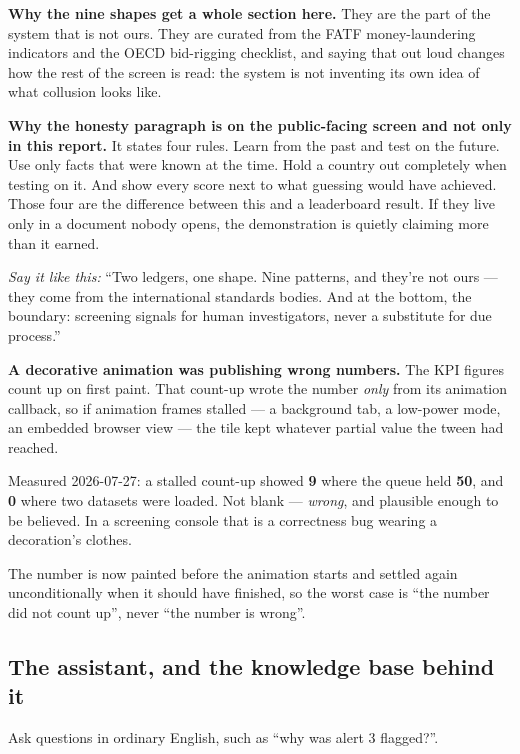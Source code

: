 \documentclass[11pt,a4paper]{article}
\newcommand{\aloud}[1]{\par\smallskip\noindent\textit{\textcolor{accent}{Say
it like this:}} ``#1''\par\smallskip}
\begin{document}
\textbf{Why the nine shapes get a whole section here.} They are the part of the
system that is not ours. They are curated from the FATF money-laundering
indicators and the OECD bid-rigging checklist, and saying that out loud changes
how the rest of the screen is read: the system is not inventing its own idea of
what collusion looks like.

\textbf{Why the honesty paragraph is on the public-facing screen and not only in
this report.} It states four rules. Learn from the past and test on the future.
Use only facts that were known at the time. Hold a country out completely when
testing on it. And show every score next to what guessing would have achieved.
Those four are the difference between this and a leaderboard result. If they
live only in a document nobody opens, the demonstration is quietly claiming
more than it earned.

\aloud{Two ledgers, one shape. Nine patterns, and they're not ours --- they come
from the international standards bodies. And at the bottom, the boundary:
screening signals for human investigators, never a substitute for due process.}

\begin{plain}
\textbf{A decorative animation was publishing wrong numbers.} The KPI figures
count up on first paint. That count-up wrote the number \emph{only} from its
animation callback, so if animation frames stalled --- a background tab, a
low-power mode, an embedded browser view --- the tile kept whatever partial
value the tween had reached.

Measured 2026-07-27: a stalled count-up showed \textbf{9} where the queue held
\textbf{50}, and \textbf{0} where two datasets were loaded. Not blank ---
\emph{wrong}, and plausible enough to be believed. In a screening console that
is a correctness bug wearing a decoration's clothes.

The number is now painted before the animation starts and settled again
unconditionally when it should have finished, so the worst case is ``the number
did not count up'', never ``the number is wrong''.
\end{plain}

\subsection{The assistant, and the knowledge base behind it}

Ask questions in ordinary English, such as ``why was alert 3 flagged?''.
\end{document}

